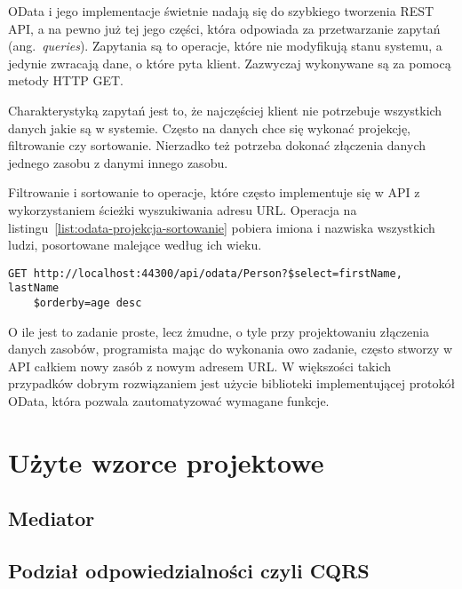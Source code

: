 OData i jego implementacje świetnie nadają się do szybkiego tworzenia REST API, a na pewno już tej jego części, która odpowiada za przetwarzanie zapytań (ang.~\emph{queries}). Zapytania są to operacje, które nie modyfikują stanu systemu, a jedynie zwracają dane, o które pyta klient. Zazwyczaj wykonywane są za pomocą metody HTTP GET. 

Charakterystyką zapytań jest to, że najczęściej klient nie potrzebuje wszystkich danych jakie są w systemie. Często na danych chce się wykonać projekcję, filtrowanie czy sortowanie. Nierzadko też potrzeba dokonać złączenia danych jednego zasobu z danymi innego zasobu. 

Filtrowanie i sortowanie to operacje, które często implementuje się w API z wykorzystaniem ścieżki wyszukiwania adresu URL. Operacja na listingu~\ref{list:odata-projekcja-sortowanie} pobiera imiona i nazwiska  wszystkich ludzi, posortowane malejące według ich wieku.

{\belowcaptionskip=-10pt
\begin{lstlisting}[label=list:odata-projekcja-sortowanie,
    caption=OData -- przykład projekcji i sortowania]
GET http://localhost:44300/api/odata/Person?$select=firstName, lastName
    $orderby=age desc
\end{lstlisting}
}

O ile jest to zadanie proste, lecz żmudne, o tyle przy projektowaniu złączenia danych zasobów, programista mając do wykonania owo zadanie, często stworzy w API całkiem nowy zasób z nowym adresem URL. W większości takich przypadków dobrym rozwiązaniem jest użycie biblioteki implementującej protokół OData, która pozwala zautomatyzować wymagane funkcje.


\section{Użyte wzorce projektowe}
\label{sec:wzorce}

\subsection{Mediator}
\label{subsec:mediator}

\subsection{Podział odpowiedzialności czyli CQRS}
\label{subsec:cqrs}

